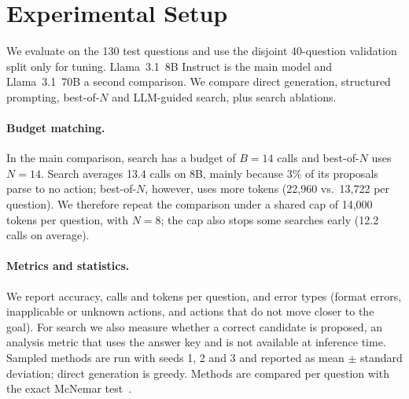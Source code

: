\section{Experimental Setup}
\label{sec:setup}

We evaluate on the 130 test questions and use the disjoint 40-question validation split only for
tuning. Llama~3.1~8B Instruct is the main model and Llama~3.1~70B a second comparison. We compare
direct generation, structured prompting, best-of-$N$ and LLM-guided search, plus search ablations.

\paragraph{Budget matching.}
In the main comparison, search has a budget of $B=14$ calls and best-of-$N$ uses $N=14$. Search
averages 13.4 calls on 8B, mainly because 3\% of its proposals parse to no action; best-of-$N$, however, uses more tokens
(22,960 vs.\ 13,722 per question). We therefore repeat the comparison under a shared cap of 14,000
tokens per question, with $N=8$; the cap also stops some searches early (12.2 calls on average).

\paragraph{Metrics and statistics.}
We report accuracy, calls and tokens per question, and error types (format errors, inapplicable or unknown actions, and actions that do not move closer to the goal). For search we also measure whether a
correct candidate is proposed, an analysis metric that uses the answer key and is not available
at inference time. Sampled methods are run with seeds 1, 2 and 3 and reported as mean $\pm$
standard deviation; direct generation is greedy. Methods are compared per question with the exact
McNemar test~\citep{mcnemar1947}.
